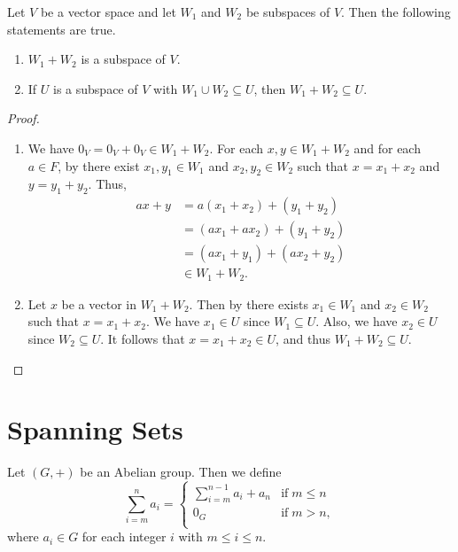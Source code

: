 \begin{proposition}\label{prop:subspace-sum}
  Let $V$ be a vector space and let $W_1$ and $W_2$ be subspaces of $V$.
  Then the following statements are true.
  \begin{enumerate}
    \item $W_1 + W_2$ is a subspace of $V$.
    \item If $U$ is a subspace of $V$ with $W_1 \cup W_2 \subseteq U$,
      then $W_1 + W_2 \subseteq U$.
  \end{enumerate}
\end{proposition}
\begin{proof} \leavevmode
  \begin{enumerate}
    \item We have $0_V = 0_V + 0_V \in W_1 + W_2$.
      For each $x, y \in W_1 + W_2$ and for each $a \in F$, by 
      there exist $x_1, y_1 \in W_1$ and $x_2, y_2 \in W_2$ such that
      $x = x_1 + x_2$ and $y = y_1 + y_2$.
      Thus,
      \begin{align*}
        ax + y
        &= a(x_1 + x_2) + (y_1 + y_2) \\
        &= (ax_1 + ax_2) + (y_1 + y_2) \\
        &= (ax_1 + y_1) + (ax_2 + y_2) \\
        &\in W_1 + W_2.
      \end{align*}
    \item Let $x$ be a vector in $W_1 + W_2$.
      Then by  there exists $x_1 \in W_1$ and $x_2 \in W_2$ such
      that $x = x_1 + x_2$.
      We have $x_1 \in U$ since $W_1 \subseteq U$.
      Also, we have $x_2 \in U$ since $W_2 \subseteq U$.
      It follows that $x = x_1 + x_2 \in U$, and thus $W_1 + W_2 \subseteq U$.
      \qedhere
  \end{enumerate}
\end{proof}

\section{Spanning Sets}
\begin{definition}\label{def:summation}
  Let $(G, +)$ be an Abelian group.
  Then we define
  \begin{equation*}
    \sum_{i=m}^n a_i =
      \left\{
      \begin{array}{ll}
        \displaystyle
          \sum_{i=m}^{n-1} a_i + a_n & \text{if} \; m \leq n\\[1.5em]
        0_G & \text{if} \; m > n,\\
      \end{array}
      \right.
  \end{equation*}
  where $a_i \in G$ for each integer $i$ with $m \leq i \leq n$.
\end{definition}

